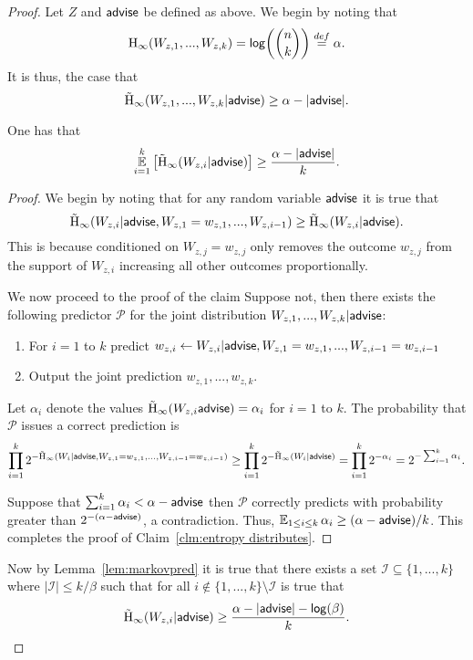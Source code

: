 \begin{proof}
Let $Z$ and ${\mathsf{advise}}$ be defined as above. We begin by noting that \[
\mathrm{H}_\infty(W_{z, 1},..., W_{z, k}) = \mathsf{log}\!\left(n\choose k\right)\overset{def}=\alpha.\]
 It is thus, the case that 
\[
\tilde{\mathrm{H}}_\infty(W_{z, 1},..., W_{z, k} | {\mathsf{advise}}) \ge \alpha - |{\mathsf{advise}}|.
\]
\begin{claim}
One has that 
\begin{align*}
\operatorname*{\mathbb{E}}_{i=1}^k \left[\tilde{\mathrm{H}}_\infty(W_{z, i} | {\mathsf{advise}})\right] \ge \frac{\alpha - |{\mathsf{advise}}|}{k}.
\end{align*}
\label{clm:entropy distributes}
\end{claim}
\begin{proof}
We begin by noting that for any random variable ${\mathsf{advise}}$ it is true that 
\[
\tilde{\mathrm{H}}_\infty(W_{z,i} | {\mathsf{advise}}, W_{z, 1}=w_{z,1},..., W_{z,i-1}) \ge \tilde{\mathrm{H}}_\infty(W_{z,i} | {\mathsf{advise}}).
\]
This is because conditioned on $W_{z, j} =w_{z,j}$ only removes the outcome $w_{z,j}$ from the support of $W_{z,i}$ increasing all other outcomes proportionally.  

We now proceed to the proof of the claim
Suppose not, then there exists the following predictor $\mathcal{P}$ for the joint distribution $W_{z, 1},..., W_{z, k} | {\mathsf{advise}}$:
\begin{enumerate}
\item For $i=1$ to $k$ predict $w_{z,i}\leftarrow W_{z, i}| {\mathsf{advise}}, W_{z,1}=w_{z,1},..., W_{z,i-1}=w_{z,i-1}$
\item Output the joint prediction $w_{z,1},..., w_{z, k}$.  
\end{enumerate}
Let $\alpha_i$ denote the values $\tilde{\mathrm{H}}_\infty(W_{z,i}{\mathsf{advise}}) = \alpha_i$ for $i=1$ to $k$. 
The probability that $\mathcal{P}$ issues a correct prediction is
\begin{align*}
\prod_{i=1}^k 2^{-\tilde{\mathrm{H}}_\infty(W_i | {\mathsf{advise}},  W_{z,1}=w_{z,1},..., W_{z,i-1}=w_{z,i-1})} \ge \prod_{i=1}^k 2^{-\tilde{\mathrm{H}}_\infty(W_i | {\mathsf{advise}})} = \prod_{i=1}^k 2^{-\alpha_i}  = 2^{-\sum_{i=1}^k \alpha_i}.
\end{align*}

Suppose that $\sum_{i=1}^k \alpha_i < \alpha-{\mathsf{advise}}$ then $\mathcal{P}$ correctly predicts with probability greater than $2^{-(\alpha-{\mathsf{advise}})}$, a contradiction.  Thus, $\operatorname*{\mathbb{E}}_{1\le i\le k} \alpha_i \ge (\alpha-{\mathsf{advise}})/k$. 
This completes the proof of Claim~\ref{clm:entropy distributes}.
\end{proof}

Now by Lemma~\ref{lem:markovpred} it is true that there exists a set $\mathcal{I}\subseteq \{1,...,k\}$ where $| \mathcal{I} | \le k/\beta$ such that for all $i\not \in \{1,...,k\} \setminus\mathcal{I}$ is true that 
\[
\tilde{\mathrm{H}}_\infty(W_{z,i} | {\mathsf{advise}}) \ge \frac{\alpha -|{\mathsf{advise}}| - \mathsf{log}\!\left(\beta\right)}{k}.
\]


\end{proof}
